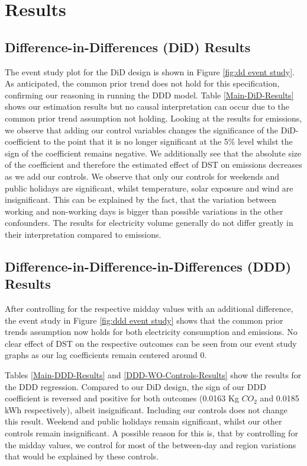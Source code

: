
\section{Results}
\subsection{Difference-in-Differences (DiD) Results}

The event study plot for the \ac{DiD} design is shown in Figure \ref{fig:dd event study}. As anticipated, the common prior trend does not hold for this specification, confirming our reasoning in running the \ac{DDD} model.
Table \ref{Main-DiD-Results} shows our estimation results but no causal interpretation can occur due to the common prior trend assumption not holding. Looking at the results for emissions, we observe that adding our control variables changes the significance of the \ac{DiD}-coefficient to the point that it is no longer significant at the 5\% level whilst the sign of the coefficient remains negative. We additionally see that the absolute size of the coefficient and therefore the estimated effect of DST on emissions decreases as we add our controls. We observe that only our controls for weekends and public holidays are significant, whilst temperature, solar exposure and wind are insignificant. This can be explained by the fact, that the variation between working and non-working days is bigger than possible variations in the other confounders. 
The results for electricity volume generally do not differ greatly in their interpretation compared to emissions.

\subsection{Difference-in-Difference-in-Differences (DDD) Results}

After controlling for the respective midday values with an additional difference, the event study in Figure \ref{fig:ddd event study} shows that the common prior trends assumption now holds for both electricity consumption and emissions. No clear effect of DST on the respective outcomes can be seen from our event study graphs as our lag coefficients remain centered around $0$.

Tables \ref{Main-DDD-Results} and \ref{DDD-WO-Controls-Results} show the results for the \ac{DDD} regression. 
Compared to our \ac{DiD} design, the sign of our \ac{DDD} coefficient is reversed and positive for both outcomes (0.0163 Kg $CO_2$ and 0.0185 kWh respectively), albeit insignificant. Including our controls does not change this result. Weekend and public holidays remain significant, whilst our other controls remain insignificant. A possible reason for this is, that by controlling for the midday values, we control for most of the between-day and region variations that would be explained by these controls. 

